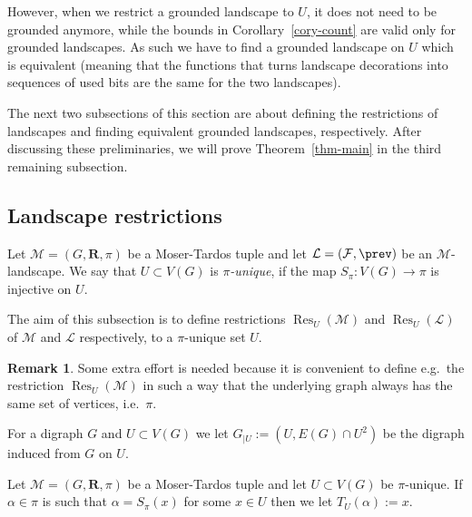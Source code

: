 \documentclass[12pt,a4paper]{article}
\numberwithin{equation}{section}
\theoremstyle{definition}
\newtheorem{remark}[equation]{Remark}
\newenvironment{myrem}{%
        \begin{mdframed}[%
            linewidth=4pt, 
            topline=false, 
            bottomline=false, 
            rightline=false,%
            leftmargin=0pt, 
            innerleftmargin=0.4em, 
            rightmargin=0pt, 
            innerrightmargin=0pt, 
            innertopmargin=0pt ,%
            innerbottommargin=0pt, 
            splittopskip=\topskip, 
            splitbottomskip=0.3\topskip, %
            ]%
        \begin{remark}
    }{%
        \end{remark}
        \end{mdframed}
    }
\newcommand{\al}{{\alpha}}
\renewcommand{\cal}[1]{{\mathcal #1}}
\newcommand\Var{\operatorname{Var}}
\newcommand\Cl{\operatorname{Cla}}
\begin{document}
However, when we restrict a grounded landscape to $U$, it does not need to be grounded anymore, while the bounds in Corollary~\ref{cory-count} are valid only for grounded landscapes. As such we have to find a grounded landscape on $U$ which is equivalent (meaning that the functions that turns landscape decorations into sequences of used bits are the same for the two landscapes). 

The next two subsections of this section are about defining the restrictions of landscapes and finding equivalent grounded landscapes, respectively. After discussing these preliminaries, we will prove Theorem~\ref{thm-main} in the third remaining subsection.
    
    
    
    
    
    
    \subsection{Landscape restrictions}\label{subsec-restrictions}
    \newcommand{\Res}{\operatorname{Res}}
    
    
    Let $\cal M = (G, \mathbf R,  \pi)$ be a Moser-Tardos tuple and let $\cal L=(\cal F,\prev)$ be an $\cal M$-landscape. We say that $U\subset V(G)$ is \emph{$\pi$-unique}, if the map $S_\pi\colon V(G)\to \pi$ is injective on $U$. 
    
    The aim of this subsection is to define restrictions $\Res_U(\cal M)$ and $\Res_U(\cal L)$ of  $\cal M$ and $\cal L$ respectively, to a $\pi$-unique set $U$.
    \begin{myrem} Some extra effort is needed because it is convenient to define e.g.~the restriction $\Res_U(\cal M)$ in such a way that the underlying graph always has the same set of vertices, i.e.~$\pi$. 
    \end{myrem}
    
    For a digraph $G$ and $U\subset V(G)$ we let $G_{|U} := (U, E(G)\cap U^2)$ be the digraph induced from $G$ on $U$.
    
    Let $\cal M = (G, \mathbf R,  \pi)$ be a Moser-Tardos tuple and let 
    $U\subset V(G)$ be $\pi$-unique. If $\al\in \pi$ is such that $\al = S_\pi(x)$ for some $x\in U$ then we let $T_U(\al):=x$. 
    
\end{document}

